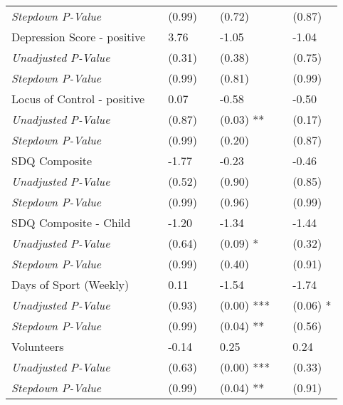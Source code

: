 \begin{tabular}{L{9cm} L{1cm} l L{1cm} l l l}
\quad \textit{Stepdown P-Value} & & (0.99)  & & (0.72)  & & (0.87) \\[3pt]
Depression Score - positive & & 3.76 & & -1.05  & & -1.04 \\
\quad \textit{Unadjusted P-Value} & & (0.31)  & & (0.38)  & & (0.75) \\
\quad \textit{Stepdown P-Value} & & (0.99)  & & (0.81)  & & (0.99) \\[3pt]
Locus of Control - positive & & 0.07 & & -0.58  & & -0.50 \\
\quad \textit{Unadjusted P-Value} & & (0.87)  & & (0.03) ** & & (0.17) \\
\quad \textit{Stepdown P-Value} & & (0.99)  & & (0.20)  & & (0.87) \\[3pt]
SDQ Composite & & -1.77 & & -0.23  & & -0.46 \\
\quad \textit{Unadjusted P-Value} & & (0.52)  & & (0.90)  & & (0.85) \\
\quad \textit{Stepdown P-Value} & & (0.99)  & & (0.96)  & & (0.99) \\[3pt]
SDQ Composite - Child & & -1.20 & & -1.34  & & -1.44 \\
\quad \textit{Unadjusted P-Value} & & (0.64)  & & (0.09) * & & (0.32) \\
\quad \textit{Stepdown P-Value} & & (0.99)  & & (0.40)  & & (0.91) \\[3pt]
Days of Sport (Weekly) & & 0.11 & & -1.54  & & -1.74 \\
\quad \textit{Unadjusted P-Value} & & (0.93)  & & (0.00) *** & & (0.06) * \\
\quad \textit{Stepdown P-Value} & & (0.99)  & & (0.04) ** & & (0.56) \\[3pt]
Volunteers & & -0.14 & & 0.25  & & 0.24 \\
\quad \textit{Unadjusted P-Value} & & (0.63)  & & (0.00) *** & & (0.33) \\
\quad \textit{Stepdown P-Value} & & (0.99)  & & (0.04) ** & & (0.91) \\[3pt]
\bottomrule
\end{tabular}

